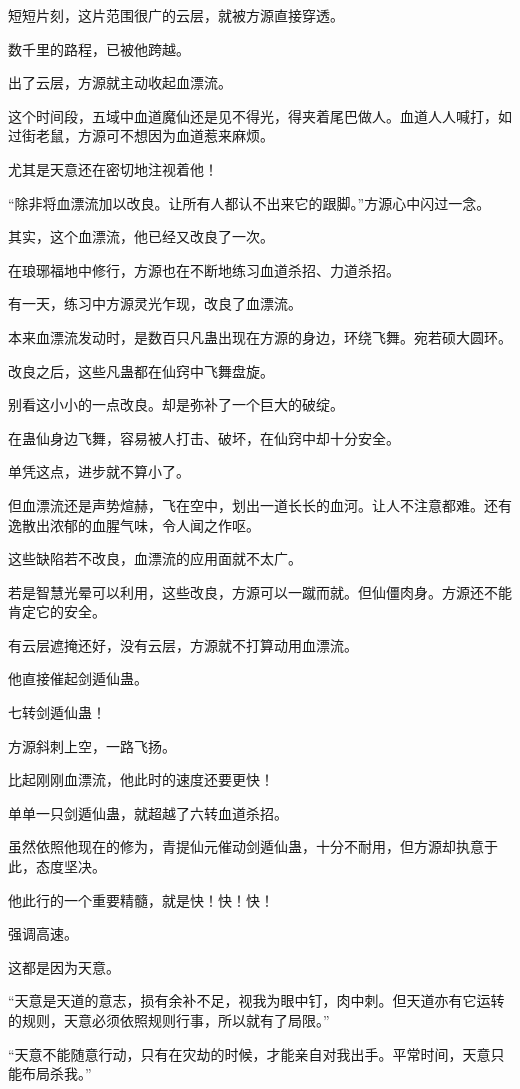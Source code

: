\begin{this_body}
短短片刻，这片范围很广的云层，就被方源直接穿透。

数千里的路程，已被他跨越。

出了云层，方源就主动收起血漂流。

这个时间段，五域中血道魔仙还是见不得光，得夹着尾巴做人。血道人人喊打，如过街老鼠，方源可不想因为血道惹来麻烦。

尤其是天意还在密切地注视着他！

“除非将血漂流加以改良。让所有人都认不出来它的跟脚。”方源心中闪过一念。

其实，这个血漂流，他已经又改良了一次。

在琅琊福地中修行，方源也在不断地练习血道杀招、力道杀招。

有一天，练习中方源灵光乍现，改良了血漂流。

本来血漂流发动时，是数百只凡蛊出现在方源的身边，环绕飞舞。宛若硕大圆环。

改良之后，这些凡蛊都在仙窍中飞舞盘旋。

别看这小小的一点改良。却是弥补了一个巨大的破绽。

在蛊仙身边飞舞，容易被人打击、破坏，在仙窍中却十分安全。

单凭这点，进步就不算小了。

但血漂流还是声势煊赫，飞在空中，划出一道长长的血河。让人不注意都难。还有逸散出浓郁的血腥气味，令人闻之作呕。

这些缺陷若不改良，血漂流的应用面就不太广。

若是智慧光晕可以利用，这些改良，方源可以一蹴而就。但仙僵肉身。方源还不能肯定它的安全。

有云层遮掩还好，没有云层，方源就不打算动用血漂流。

他直接催起剑遁仙蛊。

七转剑遁仙蛊！

方源斜刺上空，一路飞扬。

比起刚刚血漂流，他此时的速度还要更快！

单单一只剑遁仙蛊，就超越了六转血道杀招。

虽然依照他现在的修为，青提仙元催动剑遁仙蛊，十分不耐用，但方源却执意于此，态度坚决。

他此行的一个重要精髓，就是快！快！快！

强调高速。

这都是因为天意。

“天意是天道的意志，损有余补不足，视我为眼中钉，肉中刺。但天道亦有它运转的规则，天意必须依照规则行事，所以就有了局限。”

“天意不能随意行动，只有在灾劫的时候，才能亲自对我出手。平常时间，天意只能布局杀我。”


\end{this_body}
